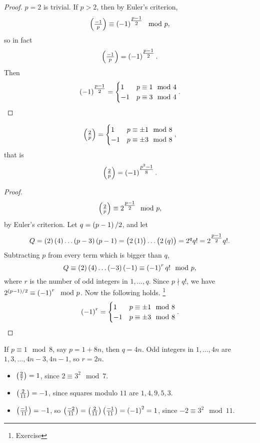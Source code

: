 \begin{proof}
$ p = 2 $ is trivial. If $ p > 2 $, then by Euler's criterion,
$$ \symbol{-1}{p} \equiv \br{-1}^{\tfrac{p - 1}{2}} \mod p, $$
so in fact
$$ \symbol{-1}{p} = \br{-1}^{\tfrac{p - 1}{2}}. $$
Then
$$ \br{-1}^{\tfrac{p - 1}{2}} =
\begin{cases}
1 & p \equiv 1 \mod 4 \\
-1 & p \equiv 3 \mod 4
\end{cases}.
$$
\end{proof}

\begin{proposition}
$$ \symbol{2}{p} =
\begin{cases}
1 & p \equiv \pm 1 \mod 8 \\
-1 & p \equiv \pm 3 \mod 8
\end{cases},
$$
that is
$$ \symbol{2}{p} = \br{-1}^{\tfrac{p^2 - 1}{8}}. $$
\end{proposition}

\begin{proof}
$$ \symbol{2}{p} \equiv 2^{\tfrac{p - 1}{2}} \mod p, $$
by Euler's criterion. Let $ q = \br{p - 1} / 2 $, and let
$$ Q = \br{2}\br{4} \dots \br{p - 3}\br{p - 1} = \br{2\br{1}} \dots \br{2\br{q}} = 2^qq! = 2^{\tfrac{p - 1}{2}}q!. $$
Subtracting $ p $ from every term which is bigger than $ q $,
$$ Q \equiv \br{2}\br{4} \dots \br{-3}\br{-1} \equiv \br{-1}^rq! \mod p, $$
where $ r $ is the number of odd integers in $ 1, \dots, q $. Since $ p \nmid q! $, we have $ 2^{\br{p - 1} / 2} \equiv \br{-1}^r \mod p $. Now the following holds. \footnote{Exercise}
$$ \br{-1}^r =
\begin{cases}
1 & p \equiv \pm 1 \mod 8 \\
-1 & p \equiv \pm 3 \mod 8
\end{cases}.
$$
\end{proof}

\pagebreak

\begin{example*}
If $ p \equiv 1 \mod 8 $, say $ p = 1 + 8n $, then $ q = 4n $. Odd integers in $ 1, \dots, 4n $ are $ 1, 3, \dots, 4n - 3, 4n - 1 $, so $ r = 2n $.
\end{example*}

\begin{example*}
\hfill
\begin{itemize}
\item $ \symbol{2}{7} = 1 $, since $ 2 \equiv 3^2 \mod 7 $.
\item $ \symbol{2}{11} = -1 $, since squares modulo $ 11 $ are $ 1, 4, 9, 5, 3 $.
\item $ \symbol{-1}{11} = -1 $, so $ \symbol{-2}{11} = \symbol{2}{11}\symbol{-1}{11} = \br{-1}^2 = 1 $, since $ -2 \equiv 3^2 \mod 11 $.
\end{itemize}
\end{example*}

